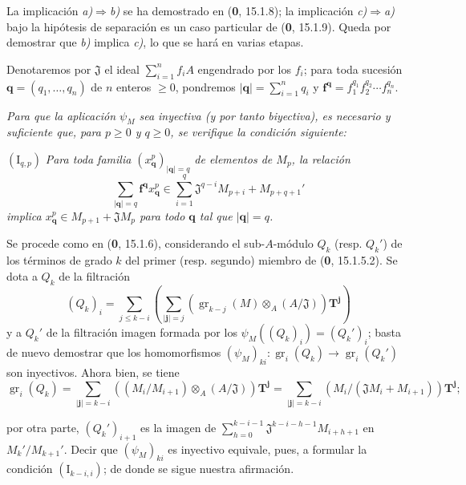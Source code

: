 La implicación \emph{a)}$\Rightarrow$\emph{b)} se ha demostrado en (\textbf{0}, 15.1.8); la implicación \emph{c)}$\Rightarrow$\emph{a)} bajo la hipótesis de separación es un caso particular de (\textbf{0}, 15.1.9). Queda por demostrar que \emph{b)} implica \emph{c)}, lo que se hará en varias etapas.

Denotaremos por $\mathfrak J$ el ideal $\sum_{i=1}^n f_iA$ engendrado por los $f_i$; para toda sucesión $\mathbf q=(q_1,\ldots,q_n)$ de $n$ enteros $\geq0$, pondremos $|\mathbf q|=\sum_{i=1}^nq_i$ y $\mathbf f^{\mathbf q}=f_1^{q_1}f_2^{q_2}\cdots f_n^{q_n}$.

\begin{env}[19.5.5.1]
\label{IV.19.5.5.1}
\emph{Para que la aplicación $\psi_M$ sea inyectiva (y por tanto biyectiva), es necesario y suficiente que, para $p\geq0$ y $q\geq0$, se verifique la condición siguiente:}

$(\mathrm I_{q,p})$ \emph{Para toda familia $(x_{\mathbf q}^p)_{|\mathbf q|=q}$ de elementos de $M_p$, la relación}
\[
  \sum_{|\mathbf q|=q}\mathbf f^{\mathbf q}x_{\mathbf q}^p\in\sum_{i=1}^q\mathfrak J^{q-i}M_{p+i}+M_{p+q+1}'
\]
\emph{implica $x_{\mathbf q}^p\in M_{p+1}+\mathfrak JM_p$ para todo $\mathbf q$ tal que $|\mathbf q|=q$.}

Se procede como en (\textbf{0}, 15.1.6), considerando el sub-$A$-módulo $Q_k$ (resp. $Q_k'$) de los términos de grado $k$ del primer (resp. segundo) miembro de (\textbf{0}, 15.1.5.2). Se dota a $Q_k$ de la filtración
\[
  (Q_k)_i=\sum_{j\leq k-i}\left(\sum_{|\mathbf j|=j}(\operatorname{gr}_{k-j}(M)\otimes_A(A/\mathfrak J))\mathbf T^{\mathbf j}\right)
\]
y a $Q_k'$ de la filtración imagen formada por los $\psi_M((Q_k)_i)=(Q_k')_i$; basta de nuevo demostrar que los homomorfismos $(\psi_M)_{ki}:\operatorname{gr}_i(Q_k)\to\operatorname{gr}_i(Q_k')$ son inyectivos. Ahora bien, se tiene
\[
  \operatorname{gr}_i(Q_k)=\sum_{|\mathbf j|=k-i}((M_i/M_{i+1})\otimes_A(A/\mathfrak J))\mathbf T^{\mathbf j}
  =\sum_{|\mathbf j|=k-i}(M_i/(\mathfrak JM_i+M_{i+1}))\mathbf T^{\mathbf j};
\]


por otra parte, $(Q_k')_{i+1}$ es la imagen de $\sum_{h=0}^{k-i-1}\mathfrak J^{k-i-h-1}M_{i+h+1}$ en $M_k'/M_{k+1}'$. Decir que $(\psi_M)_{ki}$ es inyectivo equivale, pues, a formular la condición $(\mathrm I_{k-i,i})$; de donde se sigue nuestra afirmación.
\end{env}

